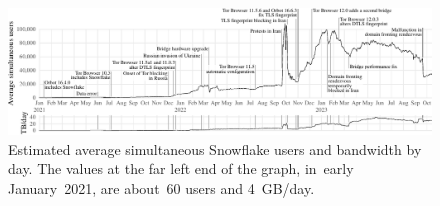 \documentclass[letterpaper,twocolumn]{article}
\begin{document}
\begin{figure}[t]
\includegraphics{figures/users/users-global}
\caption{
Estimated average simultaneous Snowflake users and bandwidth by day.
The values at the far left end of the graph,
in~early January~2021, are about~60 users
and 4~GB/day.
}
\end{figure}
\end{document}
